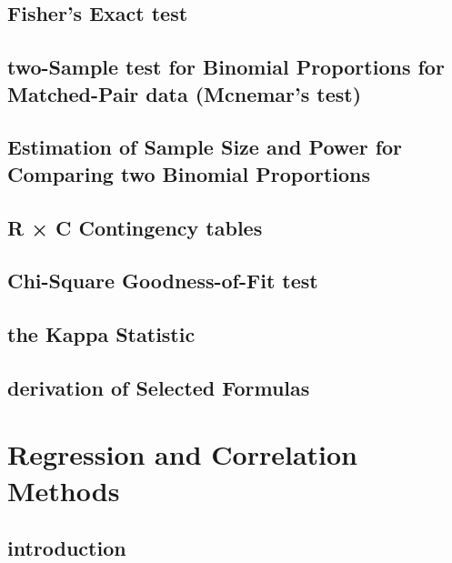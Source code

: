 \documentclass[12pt,]{article}
\theoremstyle{definition}
\theoremstyle{definition}
\theoremstyle{definition}
\theoremstyle{remark}
\begin{document}
\subsection{Fisher's Exact test}\label{fishers-exact-test}

\subsection{two-Sample test for Binomial Proportions for Matched-Pair
data (Mcnemar's
test)}\label{two-sample-test-for-binomial-proportions-for-matched-pair-data-mcnemars-test}

\subsection{Estimation of Sample Size and Power for Comparing two
Binomial
Proportions}\label{estimation-of-sample-size-and-power-for-comparing-two-binomial-proportions}

\subsection{R × C Contingency tables}\label{r-c-contingency-tables}

\subsection{Chi-Square Goodness-of-Fit
test}\label{chi-square-goodness-of-fit-test}

\subsection{the Kappa Statistic}\label{the-kappa-statistic}

\subsection{derivation of Selected
Formulas}\label{derivation-of-selected-formulas}

\section{Regression and Correlation
Methods}\label{regression-and-correlation-methods}

\subsection{introduction}\label{introduction-9}
\end{document}
